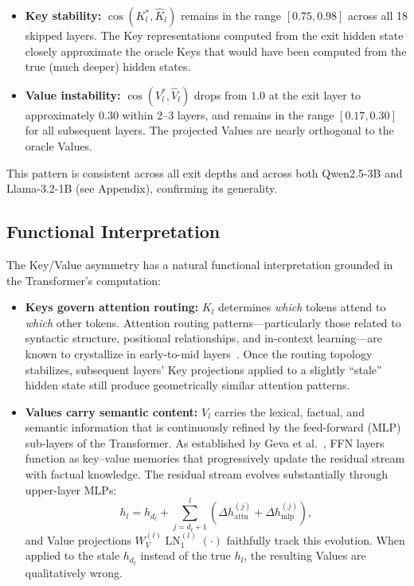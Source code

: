 \documentclass{article}
\newcommand{\dt}{d_t}
\newcommand{\Khat}{\hat{K}}
\newcommand{\Vhat}{\hat{V}}
\DeclareMathOperator{\LN}{LN}
\begin{document}
\begin{itemize}[nosep,leftmargin=*]
    \item \textbf{Key stability:} $\cos(K_l^*, \Khat_l)$ remains in the range $[0.75, 0.98]$ across all 18 skipped layers. The Key representations computed from the exit hidden state closely approximate the oracle Keys that would have been computed from the true (much deeper) hidden states.
    
    \item \textbf{Value instability:} $\cos(V_l^*, \Vhat_l)$ drops from $1.0$ at the exit layer to approximately $0.30$ within 2--3 layers, and remains in the range $[0.17, 0.30]$ for all subsequent layers. The projected Values are nearly orthogonal to the oracle Values.
\end{itemize}

This pattern is consistent across all exit depths and across both Qwen2.5-3B and Llama-3.2-1B (see Appendix), confirming its generality.

\subsection{Functional Interpretation}

The Key/Value asymmetry has a natural functional interpretation grounded in the Transformer's computation:

\begin{itemize}[nosep,leftmargin=*]
    \item \textbf{Keys govern attention routing:} $K_l$ determines \emph{which} tokens attend to \emph{which} other tokens. Attention routing patterns---particularly those related to syntactic structure, positional relationships, and in-context learning---are known to crystallize in early-to-mid layers~\cite{olsson2022context}. Once the routing topology stabilizes, subsequent layers' Key projections applied to a slightly ``stale'' hidden state still produce geometrically similar attention patterns.
    
    \item \textbf{Values carry semantic content:} $V_l$ carries the lexical, factual, and semantic information that is continuously refined by the feed-forward (MLP) sub-layers of the Transformer. As established by Geva et al.~\cite{geva2022transformer}, FFN layers function as key--value memories that progressively update the residual stream with factual knowledge. The residual stream evolves substantially through upper-layer MLPs:
    \begin{equation}
        h_l = h_{\dt} + \sum_{j=\dt+1}^{l} \left(\Delta h_{\text{attn}}^{(j)} + \Delta h_{\text{mlp}}^{(j)}\right),
    \end{equation}
    and Value projections $W_V^{(l)} \LN_1^{(l)}(\cdot)$ faithfully track this evolution. When applied to the stale $h_{\dt}$ instead of the true $h_l$, the resulting Values are qualitatively wrong.
\end{itemize}
\end{document}
